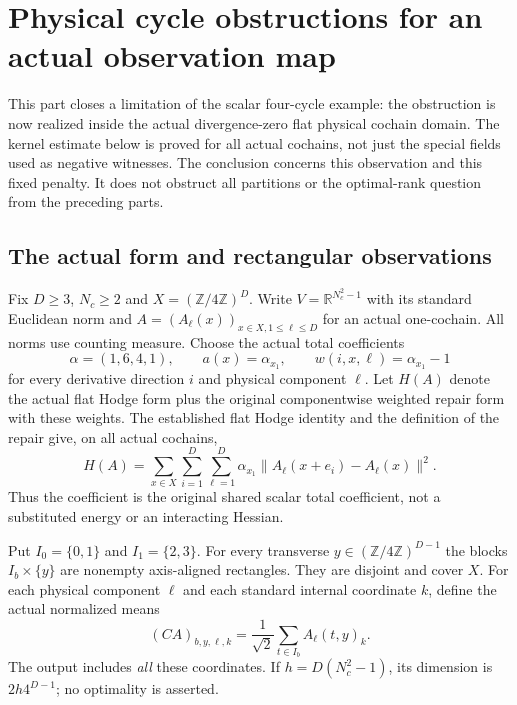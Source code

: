 \section{Physical cycle obstructions for an actual observation map}
\label{sec:physical-cycle}
This part closes a limitation of the scalar four-cycle example: the
obstruction is now realized inside the actual divergence-zero flat physical
cochain domain. The kernel estimate below is proved for all actual cochains,
not just the special fields used as negative witnesses. The conclusion
concerns this observation and this fixed penalty. It does not obstruct all
partitions or the optimal-rank question from the preceding parts.

\subsection{The actual form and rectangular observations}
Fix $D\geq3$, $N_c\geq2$ and $X=(\mathbb Z/4\mathbb Z)^D$.
Write $V=\mathbb R^{N_c^2-1}$ with its standard Euclidean norm and
$A=(A_\ell(x))_{x\in X,1\leq\ell\leq D}$ for an actual one-cochain.
All norms use counting measure. Choose the actual total coefficients
\[
 \alpha=(1,6,4,1),\qquad a(x)=\alpha_{x_1},\qquad
 w(i,x,\ell)=\alpha_{x_1}-1
\]
for every derivative direction $i$ and physical component $\ell$.
Let $H(A)$ denote the actual flat Hodge form plus the original componentwise
weighted repair form with these weights. The established flat Hodge identity
and the definition of the repair give, on all actual cochains,
\begin{equation}\label{eq:actual-cycle-energy}
 H(A)=\sum_{x\in X}\sum_{i=1}^D\sum_{\ell=1}^D
 \alpha_{x_1}\|A_\ell(x+e_i)-A_\ell(x)\|^2.
\end{equation}
Thus the coefficient is the original shared scalar total coefficient,
not a substituted energy or an interacting Hessian.

Put $I_0=\{0,1\}$ and $I_1=\{2,3\}$. For every transverse
$y\in(\mathbb Z/4\mathbb Z)^{D-1}$ the blocks $I_b\times\{y\}$
are nonempty axis-aligned rectangles. They are disjoint and cover $X$.
For each physical component $\ell$ and each standard internal coordinate $k$,
define the actual normalized means
\begin{equation}\label{eq:actual-cycle-C}
 (CA)_{b,y,\ell,k}=\frac{1}{\sqrt2}\sum_{t\in I_b} A_\ell(t,y)_k.
\end{equation}
The output includes \emph{all} these coordinates. If
$h=D(N_c^2-1)$, its dimension is $2h4^{D-1}$; no optimality is asserted.

